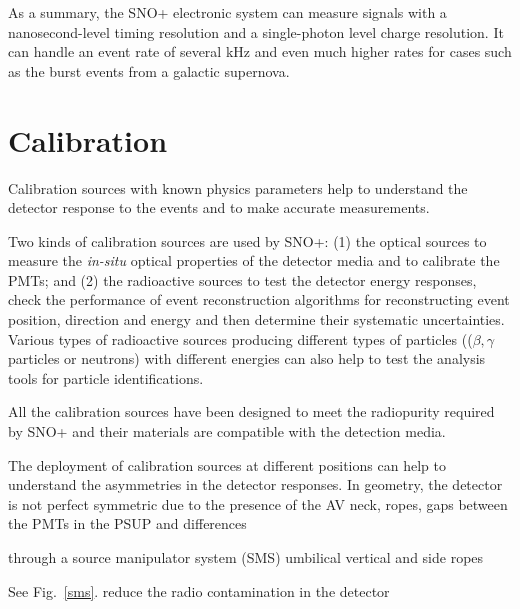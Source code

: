 As a summary, the SNO+ electronic system can measure signals with a nanosecond-level timing resolution and a single-photon level charge resolution. It can handle an event rate of several kHz and even much higher rates for cases such as the burst events from a galactic supernova\cite{snop_jinst}.

\section{Calibration}\label{sect:calibr}
Calibration sources with known physics parameters help to understand the detector response to the events and to make accurate measurements.

Two kinds of calibration sources are used by SNO+: (1) the optical sources to measure the \emph{in-situ} optical properties of the detector media and to calibrate the PMTs; and (2) the radioactive sources to test the detector energy responses, check the performance of event reconstruction algorithms for reconstructing event position, direction and energy and then determine their systematic uncertainties. Various types of radioactive sources producing different types of particles (($\beta,\gamma$ particles or neutrons) with different energies can also help to test the analysis tools for particle identifications.

All the calibration sources have been designed to meet the radiopurity required by SNO+ and their materials are compatible with the detection media\cite{snop_jinst}.

The deployment of calibration sources at different positions can help to understand the asymmetries in the detector responses. In geometry, the detector is not perfect symmetric due to the presence of the AV neck, ropes, gaps between the PMTs in the PSUP and differences    

through a source manipulator system (SMS)
umbilical vertical and side ropes

See Fig.~\ref{sms}.
reduce the radio contamination in the detector

